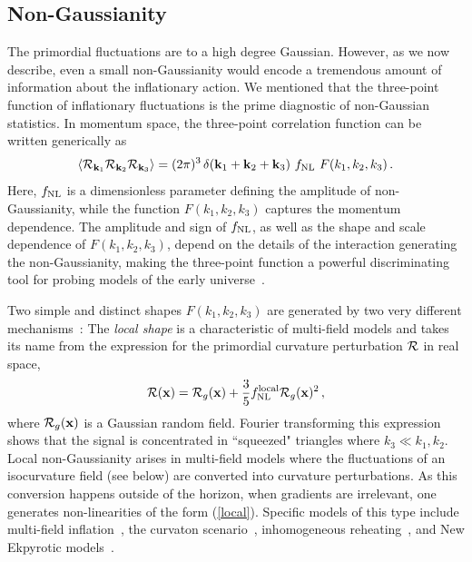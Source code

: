 \documentclass[12pt,letterpaper,rotate]{article}
\def\beq{\begin{equation}}
\def\eeq{\end{equation}}
\def\R{{\cal R}}
\begin{document}
{\subsection{Non-Gaussianity}

The primordial fluctuations are to a high degree Gaussian.
However, as we now describe, even a small non-Gaussianity would encode a tremendous amount of information about the inflationary action.
We mentioned that the three-point function of inflationary fluctuations is the prime diagnostic of non-Gaussian statistics.
In momentum space, the three-point correlation function can be written generically as
\beq
\langle \R_{{\bf k}_1} \R_{{\bf k}_2} \R_{{\bf k}_3} \rangle = (2\pi)^3\, \delta({\bf k}_1 + {\bf k}_2 + {\bf k}_3) \ f_{\rm NL} \ F(k_1, k_2, k_3)\, .
\eeq
Here, $f_{\rm NL}$ is a dimensionless parameter defining the amplitude of non-Gaussianity, while the function
$F(k_1, k_2,  k_3)$ captures the momentum dependence. The amplitude and sign of $f_{\rm NL}$, as well as the shape and scale dependence of $F(k_1,k_2,k_3)$, depend on the details of the interaction generating the
non-Gaussianity, making the three-point function a powerful discriminating tool for probing models of the early universe~\cite{NGreview}.

Two simple and distinct shapes $F( k_1, k_2,  k_3)$ are generated by two very different
mechanisms~\cite{Babich_etal_04}: The {\em local shape} is a characteristic of multi-field models and takes its
name from the expression for the primordial curvature perturbation $\R$ in real space,
\begin{equation}
\label{local} \R({\bf x}) = \R_g({\bf x}) + \frac{3}{5} f_{\rm NL}^{\rm local} \R_g({\bf x})^2\, ,
\end{equation}
where $\R_g({\bf x})$ is a Gaussian random field. Fourier transforming this expression shows that the signal
is concentrated in ``squeezed" triangles where $k_3 \ll k_1,k_2$.  Local non-Gaussianity arises in multi-field models where the fluctuations of an isocurvature field (see below) are
converted into curvature perturbations. As this conversion happens outside of the horizon, when gradients are
irrelevant, one generates non-linearities of the form (\ref{local}). Specific models of this type include multi-field inflation~\cite{BMRmulti, Bernardeau:2002jy, Bernardeau:2002jf, Sasaki:2008uc, Naruko:2008sq, Byrnes:2008wi, Byrnes:2006fr, Langlois:2008vk, Valiviita:2008zb, Assadullahi:2007uw, Valiviita:2006mz, Vernizzi:2006ve, Allen:2005ye}, the curvaton scenario~\cite{Linde:1996gt, Lyth_etal03},
inhomogeneous reheating~\cite{Dvali:2003em, Kofman:2003nx}, and New Ekpyrotic
models~\cite{Creminelli:2007aq,Koyama_etal07,Buchbinder_etal07, Lehners:2007wc,Lehners:2008my, Koyama:2007ag, Koyama:2007mg}. 

}
\end{document}
